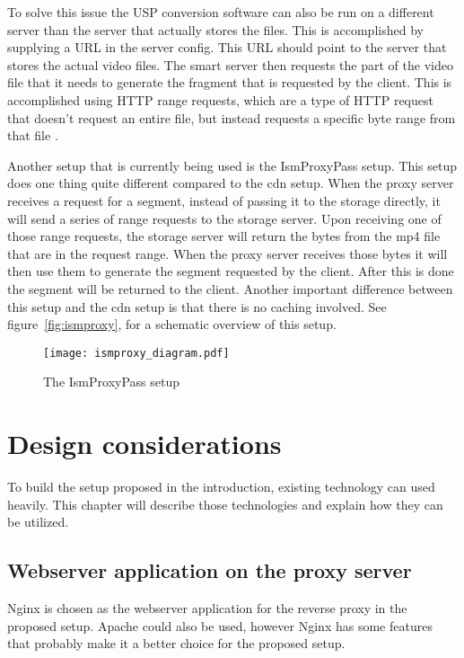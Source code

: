\documentclass[twoside,openright]{uva-bachelor-thesis}
\begin{document}
To solve this issue the USP conversion software can also be run on a different
server than the server that actually stores the files. This is accomplished by
supplying a URL in the server config. This URL should point to the server that
stores the actual video files. The smart server then requests the part of the
video file that it needs to generate the fragment that is requested by the
client. This is accomplished using HTTP range requests, which are a type of
HTTP request that doesn’t request an entire file, but instead requests a
specific byte range from that file \autocite{rangerequests}.

Another setup that is currently being used is the IsmProxyPass
setup. This setup does one thing quite different compared to the
\gls{cdn} setup. When the proxy server receives a request for a segment,
instead of passing it to the storage directly, it will send a series of range
requests to the storage server. Upon receiving one of those range requests, the
storage server will return the bytes from the mp4 file that are in the request
range. When the proxy server receives those bytes it will then use them to
generate the segment requested by the client. After this is done the segment
will be returned to the client. Another important difference between this
setup and the \gls{cdn} setup is that there is no caching involved.
See figure~\vref{fig:ismproxy}, for a schematic overview of this setup.

\begin{figure}

    \texttt{[image: ismproxy\_diagram.pdf]}
    \caption{The IsmProxyPass setup}\label{fig:ismproxy}

\end{figure}







\chapter{Design considerations}
To build the setup proposed in the introduction, existing technology can used
heavily. This chapter will describe those technologies and explain how they can
be utilized.


\section{Webserver application on the proxy server}
Nginx is chosen as the webserver application for the reverse proxy in the
proposed setup. Apache could also be used, however Nginx has some features that
probably make it a better choice for the proposed setup.
\end{document}

